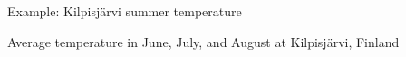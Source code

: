 \documentclass[finnish,english,t]{beamer}
\begin{document}
\begin{frame}{Example: Kilpisjärvi summer temperature}

  Average temperature in June, July, and August at Kilpisjärvi, Finland

  \begin{center}
  \end{center}

\end{frame}
\end{document}
